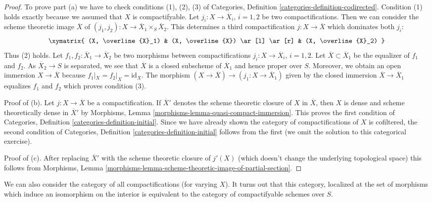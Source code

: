 \begin{proof}
To prove part (a) we have to check conditions (1), (2), (3) of
Categories, Definition \ref{categories-definition-codirected}.
Condition (1) holds exactly because we assumed that $X$
is compactifyable.
Let $j_i : X \to \overline{X}_i$, $i = 1, 2$ be two compactifications.
Then we can consider the scheme theoretic image $\overline{X}$
of $(j_1, j_2) : X \to \overline{X}_1 \times_S \overline{X}_2$.
This determines a third compactification $j : X \to \overline{X}$
which dominates both $j_i$:
$$
\xymatrix{
(X, \overline{X}_1) & (X, \overline{X}) \ar[l] \ar[r] & (X, \overline{X}_2)
}
$$
Thus (2) holds. Let $f_1, f_2 : \overline{X}_1 \to \overline{X}_2$
be two morphisms between compactifications
$j_i : X \to \overline{X}_i$, $i = 1, 2$.
Let $\overline{X} \subset \overline{X}_1$ be the equalizer of
$f_1$ and $f_2$. As $\overline{X}_2 \to S$ is separated, we see
that $\overline{X}$ is a closed subscheme of $\overline{X}_1$
and hence proper over $S$. Moreover, we obtain an
open immersion $X \to \overline{X}$ because $f_1|_X = f_2|_X = \text{id}_X$.
The morphism $(X \to \overline{X}) \to (j_1 : X \to \overline{X}_1)$
given by the closed immersion $\overline{X} \to \overline{X}_1$
equalizes $f_1$ and $f_2$ which proves condition (3).

\medskip\noindent
Proof of (b). Let $j : X \to \overline{X}$ be a compactification.
If $\overline{X}'$ denotes the scheme theoretic closure of $X$
in $\overline{X}$, then $X$ is dense and scheme theoretically dense
in $\overline{X}'$ by
Morphisms, Lemma \ref{morphisms-lemma-quasi-compact-immersion}.
This proves the first condition of
Categories, Definition \ref{categories-definition-initial}.
Since we have already shown the category of compactifications
of $X$ is cofiltered, the second condition of
Categories, Definition \ref{categories-definition-initial}
follows from the first (we omit the solution to this
categorical exercise).

\medskip\noindent
Proof of (c). After replacing $\overline{X}'$ with the scheme theoretic
closure of $j'(X)$ (which doesn't change the underlying topological space)
this follows from Morphisms, Lemma
\ref{morphisms-lemma-scheme-theoretic-image-of-partial-section}.
\end{proof}

\noindent
We can also consider the category of all compactifications (for varying $X$).
It turns out that this category, localized at the set of morphisms
which induce an isomorphism on the interior
is equivalent to the category of compactifyable schemes over $S$.

